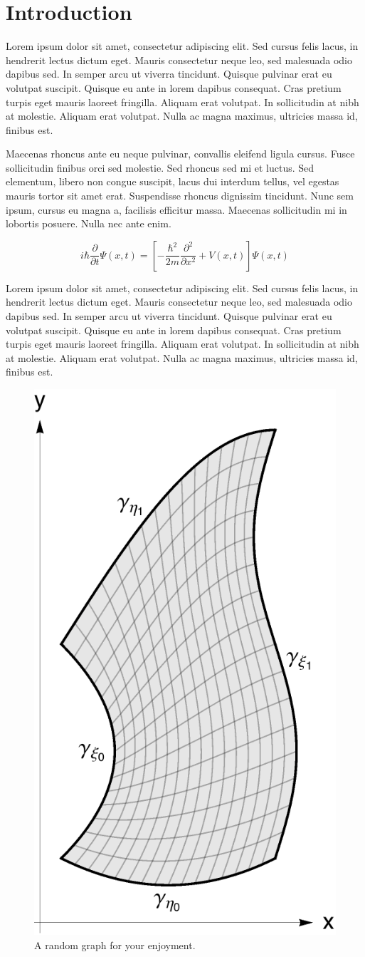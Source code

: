 \chapter{Introduction}

Lorem ipsum dolor sit amet, consectetur adipiscing elit. Sed cursus felis lacus, in hendrerit lectus dictum eget. Mauris consectetur neque leo, sed malesuada odio dapibus sed. In semper arcu ut viverra tincidunt. Quisque pulvinar erat eu volutpat suscipit. Quisque eu ante in lorem dapibus consequat. Cras pretium turpis eget mauris laoreet fringilla. Aliquam erat volutpat. In sollicitudin at nibh at molestie. Aliquam erat volutpat. Nulla ac magna maximus, ultricies massa id, finibus est.

Maecenas rhoncus ante eu neque pulvinar, convallis eleifend ligula cursus. Fusce sollicitudin finibus orci sed molestie. Sed rhoncus sed mi et luctus. Sed elementum, libero non congue suscipit, lacus dui interdum tellus, vel egestas mauris tortor sit amet erat. Suspendisse rhoncus dignissim tincidunt. Nunc sem ipsum, cursus eu magna a, facilisis efficitur massa. Maecenas sollicitudin mi in lobortis posuere. Nulla nec ante enim.

\begin{equation}
    i\hbar\frac{\partial}{\partial t}\Psi \left(x,t\right) = \left[-\frac{\hbar^2}{2m}
\frac{\partial^2}{\partial x^2} + V\left(x,t\right)\right]\Psi\left(x,t\right)
\end{equation}

Lorem ipsum dolor sit amet, consectetur adipiscing elit. Sed cursus felis lacus, in hendrerit lectus dictum eget. Mauris consectetur neque leo, sed malesuada odio dapibus sed. In semper arcu ut viverra tincidunt. Quisque pulvinar erat eu volutpat suscipit. Quisque eu ante in lorem dapibus consequat. Cras pretium turpis eget mauris laoreet fringilla.\cite{Maldacena} Aliquam erat volutpat. In sollicitudin at nibh at molestie. Aliquam erat volutpat. Nulla ac magna maximus, ultricies massa id, finibus est.

\begin{figure}[t]
    \hfil\includegraphics[width=.35\textwidth]{content/mainmatter/chapter1/figures/testfig1.pdf}\hfil
    \caption{A random graph for your enjoyment.}
    \label{fig:random graph}
\end{figure}

